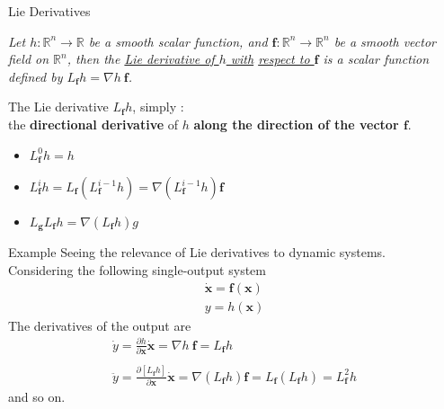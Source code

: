 \documentclass{beamer}
\renewcommand{\vec}[1]{\ensuremath{\boldsymbol{#1}}} %
\begin{document}
\begin{frame}{Lie Derivatives}
    \begin{definition}[6.1]
    \textit{
        Let $h : \mathbb{R}^{n} \rightarrow \mathbb{R}$ be a smooth scalar function, and $\vec{f} : \mathbb{R}^{n} \rightarrow \mathbb{R}^{n}$ be a smooth vector field on $\mathbb{R}^{n}$, then the \underline{Lie derivative of $h$ with}
        \underline{respect to \vec{f}} is a scalar function defined by {\color{red} $L_{\vec{f}}h = \nabla h ~\vec{f}$}.
        }
    \end{definition}

    The Lie derivative $L_{\vec{f}}h$, simply : \\
    the \textbf{directional derivative} of $h$ \textbf{along the direction of the vector \vec{f}}.
    \begin{itemize}
      \item $L_{\vec{f}}^{0}h = h$
      \item $L_{\vec{f}}^{i}h = L_{\vec{f}}(L_{\vec{f}}^{i-1}h) = \nabla(L_{\vec{f}}^{i-1}h )\vec{f}$
      \item $L_{\vec{g}}L_{\vec{f}}h = \nabla(L_{\vec{f}}h)g $
    \end{itemize}
\end{frame}

\begin{frame}{Example}
    Seeing the relevance of {\color{red}Lie derivatives} to {\color{red}dynamic systems}.
    \\
    Considering the following single-output system
    $$
    \begin{array}{l}{\dot{\mathbf{x}}=\mathbf{f}(\mathbf{x})} \\ {y=h(\mathbf{x})}\end{array}
    $$
    The derivatives of the output are
    $$
    \begin{array}{l}{\dot{y}=\frac{\partial h}{\partial \vec{x}} \dot{\vec{x}}= \nabla h~\vec{f} = L_{\vec{f}} h} \\ \\
    {\ddot{y}=\frac{\partial\left[L_{\vec{f}} h\right]}{\partial \vec{x}} \dot{\vec{x}} = \nabla(L_{\vec{f}}h)\vec{f} = L_{\vec{f}}(L_{\vec{f}}h) = L_{\vec{f}}^{2} h}\end{array}
    $$
    and so on.
\end{frame}
\end{document}

